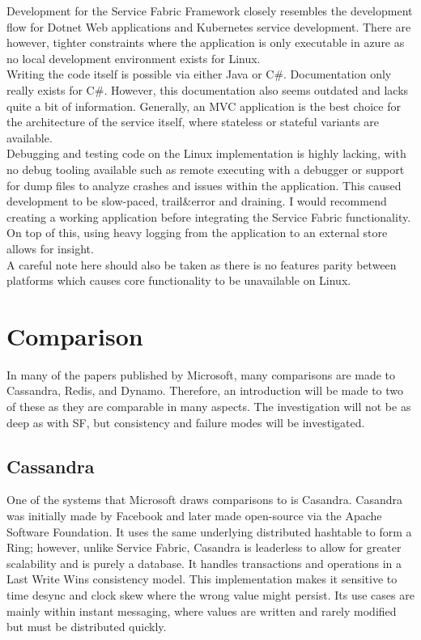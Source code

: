 \documentclass[a4paper,10pt,titlepage]{report}
\begin{document}
    Development for the Service Fabric Framework closely resembles the development flow for Dotnet Web applications and Kubernetes service development. There are however, tighter constraints where the application is only executable in azure as no local development environment exists for Linux. \\
    
    Writing the code itself is possible via either Java or C\#. Documentation only really exists for C\#. However, this documentation also seems outdated and lacks quite a bit of information. Generally, an MVC application is the best choice for the architecture of the service itself, where stateless or stateful variants are available.\\
    
    Debugging and testing code on the Linux implementation is highly lacking, with no debug tooling available such as remote executing with a debugger or support for dump files to analyze crashes and issues within the application. This caused development to be slow-paced, trail\&error and draining. I would recommend creating a working application before integrating the Service Fabric functionality. On top of this, using heavy logging from the application to an external store allows for insight.
   \\
   A careful note here should also be taken as there is no features parity between platforms which causes core functionality to be unavailable on Linux.



\section{Comparison}
In many of the papers published by Microsoft, many comparisons are made to Cassandra, Redis, and Dynamo. Therefore, an introduction will be made to two of these as they are comparable in many aspects. The investigation will not be as deep as with SF, but consistency and failure modes will be investigated.

    
    
\subsection{Cassandra}

One of the systems that Microsoft draws comparisons to is Casandra. Casandra was initially made by Facebook and later made open-source via the Apache Software Foundation. It uses the same underlying distributed hashtable to form a Ring; however, unlike Service Fabric, Casandra is leaderless to allow for greater scalability and is purely a database. It handles transactions and operations in a Last Write Wins consistency model. This implementation makes it sensitive to time desync and clock skew where the wrong value might persist. Its use cases are mainly within instant messaging, where values are written and rarely modified but must be distributed quickly. 
\end{document}
